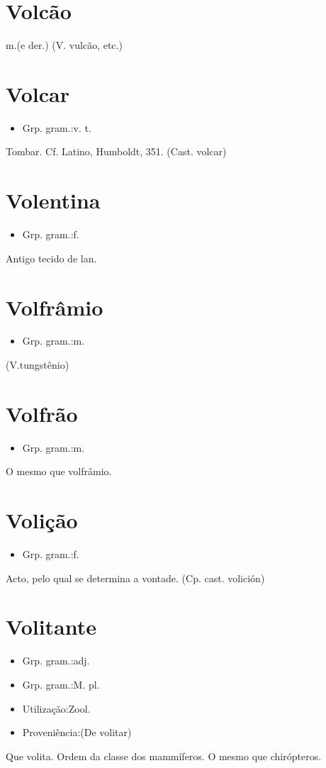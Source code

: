 \documentclass{article}
\begin{document}
\section{Volcão}
\textunderscore m.\textunderscore  (e der.)
(V. \textunderscore vulcão\textunderscore , etc.)
\section{Volcar}
\begin{itemize}
\item {Grp. gram.:v. t.}
\end{itemize}
Tombar. Cf. Latino, \textunderscore Humboldt\textunderscore , 351.
(Cast. \textunderscore volcar\textunderscore )
\section{Volentina}
\begin{itemize}
\item {Grp. gram.:f.}
\end{itemize}
Antigo tecido de lan.
\section{Volfrâmio}
\begin{itemize}
\item {Grp. gram.:m.}
\end{itemize}
(V.tungstênio)
\section{Volfrão}
\begin{itemize}
\item {Grp. gram.:m.}
\end{itemize}
O mesmo que \textunderscore volfrâmio\textunderscore .
\section{Volição}
\begin{itemize}
\item {Grp. gram.:f.}
\end{itemize}
Acto, pelo qual se determina a vontade.
(Cp. cast. \textunderscore volición\textunderscore )
\section{Volitante}
\begin{itemize}
\item {Grp. gram.:adj.}
\end{itemize}
\begin{itemize}
\item {Grp. gram.:M. pl.}
\end{itemize}
\begin{itemize}
\item {Utilização:Zool.}
\end{itemize}
\begin{itemize}
\item {Proveniência:(De \textunderscore volitar\textunderscore )}
\end{itemize}
Que volita.
Ordem da classe dos mammíferos.
O mesmo que \textunderscore chirópteros\textunderscore .
\end{document}
